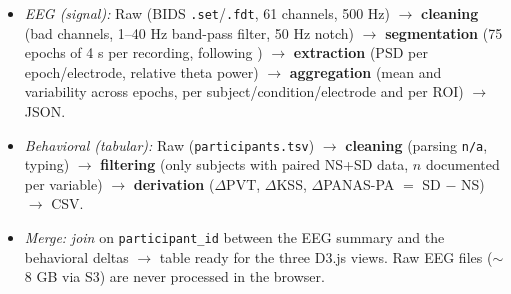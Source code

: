 \documentclass[10pt]{article}
\begin{document}
{\begin{itemize}
    \begin{itemize}
        \item[--] \emph{EEG (signal):} Raw (BIDS \texttt{.set}/\texttt{.fdt}, 61 channels, 500 Hz) $\rightarrow$ \textbf{cleaning} (bad channels, 1--40 Hz band-pass filter, 50 Hz notch) $\rightarrow$ \textbf{segmentation} (75 epochs of 4 s per recording, following \citealt{cui2026}) $\rightarrow$ \textbf{extraction} (PSD per epoch/electrode, relative theta power) $\rightarrow$ \textbf{aggregation} (mean and variability across epochs, per subject/condition/electrode and per ROI) $\rightarrow$ JSON.
        \item[--] \emph{Behavioral (tabular):} Raw (\texttt{participants.tsv}) $\rightarrow$ \textbf{cleaning} (parsing \texttt{n/a}, typing) $\rightarrow$ \textbf{filtering} (only subjects with paired NS+SD data, $n$ documented per variable) $\rightarrow$ \textbf{derivation} ($\Delta$PVT, $\Delta$KSS, $\Delta$PANAS-PA $=$ SD $-$ NS) $\rightarrow$ CSV.
        \item[--] \emph{Merge:} \emph{join} on \texttt{participant\_id} between the EEG summary and the behavioral deltas $\rightarrow$ table ready for the three D3.js views. Raw EEG files ($\sim$8 GB via S3) are never processed in the browser.
    \end{itemize}
\end{itemize}
}
\end{document}
